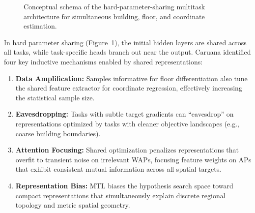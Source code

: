 \begin{figure}[!t]
\centering
\begin{minipage}{0.95\columnwidth}
\centering
{}
\end{minipage}
\caption{Conceptual schema of the hard-parameter-sharing multitask architecture for simultaneous building, floor, and coordinate estimation.}
\label{fig:mtl-arch}
\end{figure}

In hard parameter sharing (Figure~\ref{fig:mtl-arch}), the initial hidden layers are shared across all tasks, while task-specific heads branch out near the output. Caruana identified four key inductive mechanisms enabled by shared representations:
\begin{enumerate}
    \item \textbf{Data Amplification:} Samples informative for floor differentiation also tune the shared feature extractor for coordinate regression, effectively increasing the statistical sample size.
    \item \textbf{Eavesdropping:} Tasks with subtle target gradients can ``eavesdrop'' on representations optimized by tasks with cleaner objective landscapes (e.g., coarse building boundaries).
    \item \textbf{Attention Focusing:} Shared optimization penalizes representations that overfit to transient noise on irrelevant WAPs, focusing feature weights on APs that exhibit consistent mutual information across all spatial targets.
    \item \textbf{Representation Bias:} MTL biases the hypothesis search space toward compact representations that simultaneously explain discrete regional topology and metric spatial geometry.
\end{enumerate}

